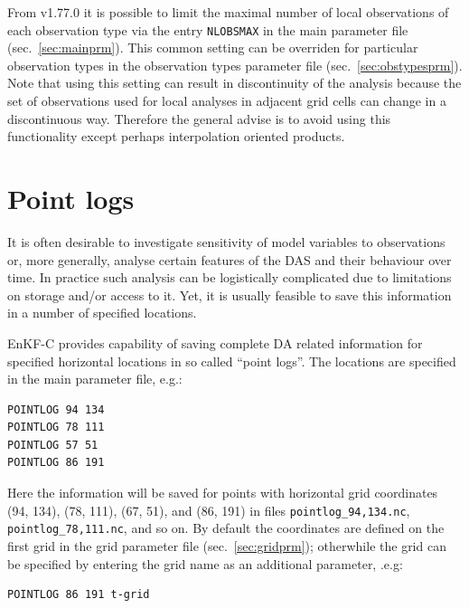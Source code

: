 \documentclass[11pt]{report}
\begin{document}
From v1.77.0 it is possible to limit the maximal number of local observations of each observation type via the entry \verb|NLOBSMAX| in the main parameter file (sec.~\ref{sec:mainprm}).
This common setting can be overriden for particular observation types in the observation types parameter file (sec.~\ref{sec:obstypesprm}).
Note that using this setting can result in discontinuity of the analysis because the set of observations used for local analyses in adjacent grid cells can change in a discontinuous way.
Therefore the general advise is to avoid using this functionality except perhaps interpolation oriented products.

\section{Point logs}
\label{sec:pointlogs}

It is often desirable to investigate sensitivity of model variables to observations or, more generally,  analyse certain features of the DAS and their behaviour over time.
In practice such analysis can be logistically complicated due to limitations on storage and/or access to it.
Yet, it is usually feasible to save this information in a number of specified locations.

EnKF-C provides capability of saving complete DA related information for specified horizontal locations in so called ``point logs''.
The locations are specified in the main parameter file, e.g.:
\begin{Verbatim}
POINTLOG 94 134
POINTLOG 78 111
POINTLOG 57 51
POINTLOG 86 191
\end{Verbatim}
Here the information will be saved for points with horizontal grid coordinates (94, 134), (78, 111), (67, 51), and (86, 191) in files \verb|pointlog_94,134.nc|, \verb|pointlog_78,111.nc|, and so on.
By default the coordinates are defined on the first grid in the grid parameter file (sec.~\ref{sec:gridprm}); otherwhile the grid can be specified by entering the grid name as an additional parameter, .e.g:
\begin{Verbatim}
POINTLOG 86 191 t-grid
\end{Verbatim}
\end{document}
